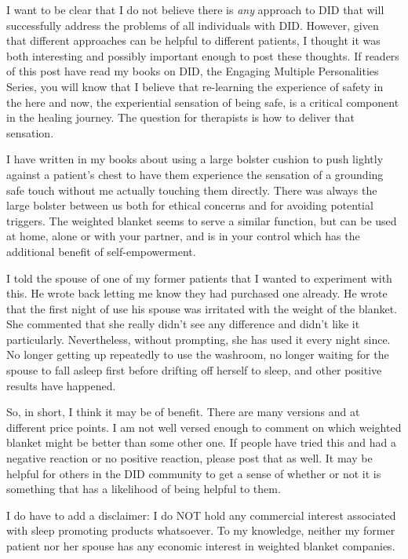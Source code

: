 \documentclass[]{book}
\begin{document}
I want to be clear that I do not believe there is \emph{any} approach to DID that will successfully address the problems of all individuals with DID. However, given that different approaches can be helpful to different patients, I thought it was both interesting and possibly important enough to post these thoughts. If readers of this post have read my books on DID, the Engaging Multiple Personalities Series, you will know that I believe that re-learning the experience of safety in the here and now, the experiential sensation of being safe, is a critical component in the healing journey. The question for therapists is how to deliver that sensation.

I have written in my books about using a large bolster cushion to push lightly against a patient's chest to have them experience the sensation of a grounding safe touch without me actually touching them directly. There was always the large bolster between us both for ethical concerns and for avoiding potential triggers. The weighted blanket seems to serve a similar function, but can be used at home, alone or with your partner, and is in your control which has the additional benefit of self-empowerment.

I told the spouse of one of my former patients that I wanted to experiment with this. He wrote back letting me know they had purchased one already. He wrote that the first night of use his spouse was irritated with the weight of the blanket. She commented that she really didn't see any difference and didn't like it particularly. Nevertheless, without prompting, she has used it every night since. No longer getting up repeatedly to use the washroom, no longer waiting for the spouse to fall asleep first before drifting off herself to sleep, and other positive results have happened.

So, in short, I think it may be of benefit. There are many versions and at different price points. I am not well versed enough to comment on which weighted blanket might be better than some other one. If people have tried this and had a negative reaction or no positive reaction, please post that as well. It may be helpful for others in the DID community to get a sense of whether or not it is something that has a likelihood of being helpful to them.

I do have to add a disclaimer: I do NOT hold any commercial interest associated with sleep promoting products whatsoever. To my knowledge, neither my former patient nor her spouse has any economic interest in weighted blanket companies.
\end{document}
